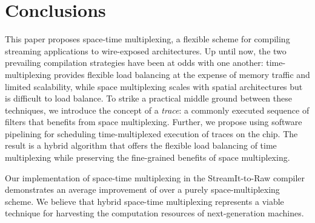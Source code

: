 \section{Conclusions}
\label{sec:conclusion}

This paper proposes space-time multiplexing, a flexible scheme for
compiling streaming applications to wire-exposed architectures.  Up
until now, the two prevailing compilation strategies have been at odds
with one another: time-multiplexing provides flexible load balancing
at the expense of memory traffic and limited scalability, while space
multiplexing scales with spatial architectures but is difficult to
load balance.  To strike a practical middle ground between these
techniques, we introduce the concept of a {\it trace}: a commonly
executed sequence of filters that benefits from space multiplexing.
Further, we propose using software pipelining for scheduling
time-multiplexed execution of traces on the chip.  The result is a
hybrid algorithm that offers the flexible load balancing of time
multiplexing while preserving the fine-grained benefits of space
multiplexing.


Our implementation of space-time multiplexing in the StreamIt-to-Raw
compiler demonstrates an average improvement of  over a
purely space-multiplexing scheme.  We believe that hybrid space-time
multiplexing represents a viable technique for harvesting the
computation resources of next-generation machines.
